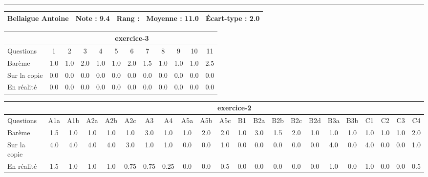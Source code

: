 \documentclass[a4paper, landscape, 10pt]{article}
\begin{document}
  \vspace{0.3cm}
  \hrule
  \vspace{0.3cm}

  \begin{minipage}{\textwidth}
    { \bf
    \begin{tabular}{|c|*{4}{c|}}
    \hline
      Bellaigue Antoine & Note : 9.4 & Rang :  & Moyenne : 11.0 & \'Ecart-type : 2.0 \\
    \hline
    \end{tabular}
    }
    
      \begin{tabular}{|l|*{ 11 }{c|}}
        \hline
        & \multicolumn{ 11 }{c|}{ exercice-3 } \\
        \hline
        Questions & 1&2&3&4&5&6&7&8&9&10&11 \\
        \hline
        Barème & 1.0&1.0&2.0&1.0&1.0&2.0&1.5&1.0&1.0&1.0&2.5 \\
        \hline
        Sur la copie & 0.0&0.0&0.0&0.0&0.0&0.0&0.0&0.0&0.0&0.0&0.0 \\
        \hline
        En réalité & 0.0&0.0&0.0&0.0&0.0&0.0&0.0&0.0&0.0&0.0&0.0 \\
        \hline
      \end{tabular}
    
      \begin{tabular}{|l|*{ 21 }{c|}}
        \hline
        & \multicolumn{ 21 }{c|}{ exercice-2 } \\
        \hline
        Questions & A1a&A1b&A2a&A2b&A2c&A3&A4&A5a&A5b&A5c&B1&B2a&B2b&B2c&B2d&B3a&B3b&C1&C2&C3&C4 \\
        \hline
        Barème & 1.5&1.0&1.0&1.0&1.0&3.0&1.0&1.0&2.0&2.0&1.0&3.0&1.5&2.0&1.0&1.0&1.0&1.0&1.0&1.0&2.0 \\
        \hline
        Sur la copie & 4.0&4.0&4.0&4.0&3.0&1.0&1.0&0.0&0.0&1.0&0.0&0.0&0.0&0.0&0.0&4.0&0.0&4.0&0.0&0.0&1.0 \\
        \hline
        En réalité & 1.5&1.0&1.0&1.0&0.75&0.75&0.25&0.0&0.0&0.5&0.0&0.0&0.0&0.0&0.0&1.0&0.0&1.0&0.0&0.0&0.5 \\
        \hline
      \end{tabular}
    

\end{minipage}
\end{document}
